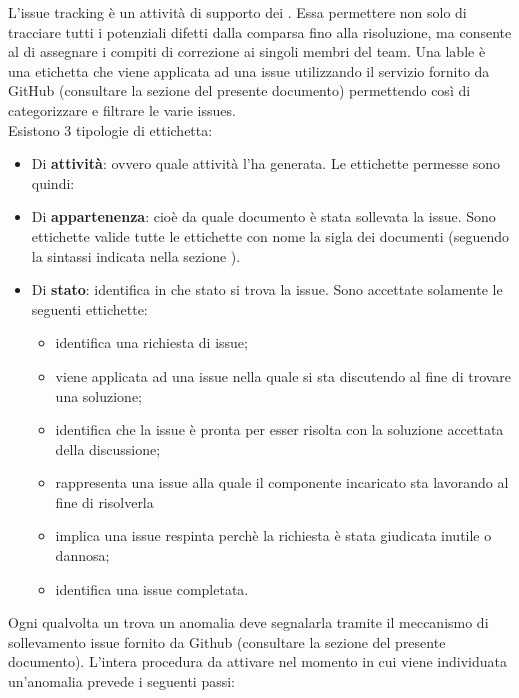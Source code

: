 			L'issue tracking è un attività di supporto dei . Essa permettere non solo di tracciare tutti i potenziali difetti dalla comparsa fino alla risoluzione, ma consente al  di assegnare i compiti di correzione ai singoli membri del team.
				Una lable è una etichetta che viene applicata ad una issue utilizzando il servizio fornito da GitHub (consultare la sezione  del presente documento) permettendo così di categorizzare e filtrare le varie issues.\\
				Esistono 3 tipologie di ettichetta:
				\begin{itemize}
				    \item Di \textbf{attività}: ovvero quale attività l'ha generata. Le ettichette permesse sono quindi: 
				    \item Di \textbf{appartenenza}: cioè da quale documento è stata sollevata la issue. Sono ettichette valide tutte le ettichette con nome la sigla dei documenti (seguendo la sintassi indicata nella sezione ).
				    \item Di \textbf{stato}: identifica in che stato si trova la issue. Sono accettate solamente le seguenti ettichette:
				\begin{itemize}
				    \item {} identifica una richiesta di issue;
				    \item {} viene applicata ad una issue nella quale si sta discutendo al fine di trovare una soluzione;
				    \item {} identifica che la issue è pronta per esser risolta con la soluzione accettata della discussione;
				    \item {} rappresenta una issue alla quale il componente incaricato sta lavorando al fine di risolverla
				    \item {} implica una issue respinta perchè la richiesta è stata giudicata inutile o dannosa;
				    \item {} identifica una issue completata.
				\end{itemize}
				\end{itemize}
				Ogni qualvolta un  trova un anomalia deve segnalarla tramite il meccanismo di sollevamento issue fornito da Github (consultare la sezione  del presente documento). L'intera procedura da attivare nel momento in cui viene individuata un'anomalia prevede i seguenti passi:
